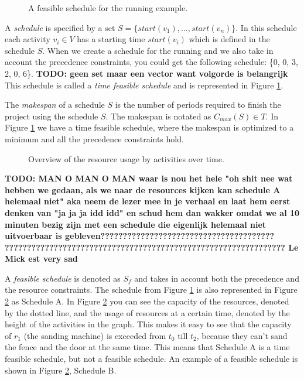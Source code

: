 \documentclass{article}
\theoremstyle{definition}
\newcommand{\inputtikz}[1]{}
\newcommand{\TODO}[1]{{\color{red}\textbf{TODO: #1}}}
\newcommand{\start}[1]{\ensuremath{start(v_{#1})}} %
\newcommand{\makespan}[1]{\ensuremath{C_{max}(#1)}} %
\begin{document}
\begin{figure}[h]
	\centering
	\inputtikz{schedule_feasible}
	\caption{A feasible schedule for the running example. }
	\label{fig:time_feasible_schedule}
\end{figure}

A \emph{schedule} is specified by a set $S = \{\start{1}, \ldots, \start{n}\}$.
In this schedule each activity $v_i \in V$ has a starting time $\start{i}$ which is defined in the schedule $S$.
When we create a schedule for the running and we also take in account the precedence constraints, you could get the following schedule:
\{0, 0, 3, 2, 0, 6\}. \TODO{geen set maar een vector want volgorde is belangrijk}
This schedule is called a \emph{time feasible schedule} and is represented in Figure \ref{fig:time_feasible_schedule}. 

The \emph{makespan} of a schedule $S$ is the number of periods required to finish the project using the schedule $S$. The makespan is notated as $\makespan{S} \in T$.
In Figure \ref{fig:time_feasible_schedule} we have a time feasible schedule, where the makespan is optimized to a minimum and all the precedence constraints hold.

\begin{figure}[h]
	\centering
	\inputtikz{schedule_feasible_profile}
	\caption{Overview of the resource usage by activities over time. }
	\label{fig:feasible_schedule}
\end{figure}

\TODO{MAN O MAN O MAN waar is nou het hele "oh shit nee wat hebben we gedaan, als we naar de resources kijken kan schedule A helemaal niet" aka neem de lezer mee in je verhaal en laat hem eerst denken van "ja ja ja idd idd" en schud hem dan wakker omdat we al 10 minuten bezig zijn met een schedule die eigenlijk helemaal niet uitvoerbaar is gebleven???????????????????????????????????????
??????????????????????????????????????????????????????????????? Le Mick est very sad}

A \emph{feasible schedule} is denoted as $S_f$ and takes in account both the precedence and the resource constraints.
The schedule from Figure \ref{fig:time_feasible_schedule} is also represented in Figure \ref{fig:feasible_schedule} as Schedule A.
In Figure \ref{fig:feasible_schedule} you can see the capacity of the resources, denoted by the dotted line, and the usage of resources at a certain time, denoted by the height of the activities in the graph.
This makes it easy to see that the capacity of $r_1$ (the sanding machine) is exceeded from $t_0$ till $t_2$, because they can't sand the fence and the door at the same time.
This means that Schedule A is a time feasible schedule, but not a feasible schedule.
An example of a feasible schedule is shown in Figure \ref{fig:feasible_schedule}, Schedule B.
\end{document}

